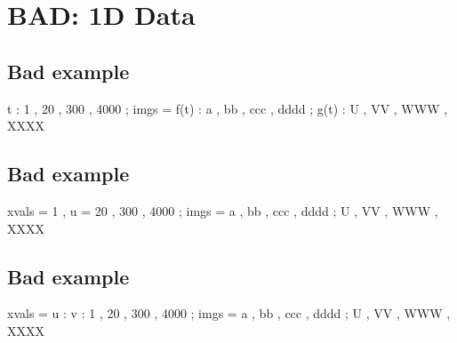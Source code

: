 \documentclass{tutodoc}
\begin{document}
\section{BAD: 1D Data}

\subsection{Bad example \thesubsection}

\begin{functable}
               t : 1 , 20 , 300 , 4000 ;
    imgs  = f(t) : a , bb , ccc , dddd ;
            g(t) : U , VV , WWW , XXXX
\end{functable}


\subsection{Bad example \thesubsection}

\begin{functable}
    xvals = 1 , u = 20 , 300 , 4000 ;
    imgs  = a , bb , ccc , dddd ;
            U , VV , WWW , XXXX
\end{functable}


\subsection{Bad example \thesubsection}

\begin{functable}
    xvals = u : v : 1 , 20 , 300 , 4000 ;
    imgs  = a , bb , ccc , dddd ;
            U , VV , WWW , XXXX
\end{functable}


%
\end{document}
